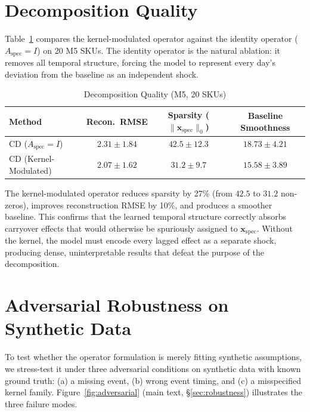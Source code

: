 \documentclass[10pt]{article} %
\theoremstyle{plain}
\theoremstyle{definition}
\newcommand{\xspec}{\mathbf{x}_{\text{spec}}}
\newcommand{\Aspec}{A_{\text{spec}}}
\begin{document}
\section{Decomposition Quality}
\label{app:decomposition}

Table~\ref{tab:decomposition} compares the kernel-modulated operator against the identity operator ($\Aspec = I$) on 20 M5 SKUs. The identity operator is the natural ablation: it removes all temporal structure, forcing the model to represent every day's deviation from the baseline as an independent shock.

\begin{table}[ht]
\centering
\footnotesize
\setlength{\tabcolsep}{2pt}
\caption{Decomposition Quality (M5, 20 SKUs)}
\label{tab:decomposition}
\begin{tabular}{@{}lccc@{}}
\toprule
Method & Recon.~RMSE & Sparsity ($\|\xspec\|_0$) & Baseline Smoothness \\
\midrule
CD ($\Aspec = I$) & $2.31 \pm 1.84$ & $42.5 \pm 12.3$ & $18.73 \pm 4.21$ \\
CD (Kernel-Modulated) & $\mathbf{2.07 \pm 1.62}$ & $\mathbf{31.2 \pm 9.7}$ & $\mathbf{15.58 \pm 3.89}$ \\
\bottomrule
\end{tabular}
\end{table}

The kernel-modulated operator reduces sparsity by 27\% (from $42.5$ to $31.2$ non-zeros), improves reconstruction RMSE by 10\%, and produces a smoother baseline. This confirms that the learned temporal structure correctly absorbs carryover effects that would otherwise be spuriously assigned to $\xspec$. Without the kernel, the model must encode every lagged effect as a separate shock, producing dense, uninterpretable results that defeat the purpose of the decomposition.


\section{Adversarial Robustness on Synthetic Data}
\label{app:adversarial_synthetic}

To test whether the operator formulation is merely fitting synthetic assumptions, we stress-test it under three adversarial conditions on synthetic data with known ground truth: (a) a missing event, (b) wrong event timing, and (c) a misspecified kernel family. Figure~\ref{fig:adversarial} (main text, \S\ref{sec:robustness}) illustrates the three failure modes.
\end{document}
